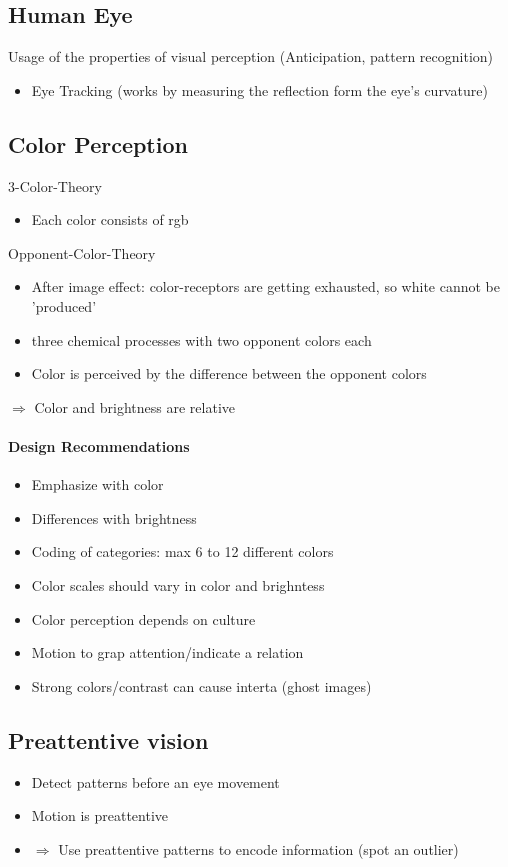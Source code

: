 \documentclass[ngerman]{scrartcl}
\begin{document}
\subsection*{Human Eye}
Usage of the properties of visual perception (Anticipation, pattern recognition)
\begin{itemize}
  \item Eye Tracking (works by measuring the reflection form the eye's curvature)
\end{itemize}

\subsection{Color Perception}
3-Color-Theory
\begin{itemize}
  \item Each color consists of rgb
\end{itemize}
Opponent-Color-Theory
\begin{itemize}
  \item After image effect: color-receptors are getting exhausted, so white cannot be 'produced'
  \item three chemical processes with two opponent colors each 
  \item Color is perceived by the difference between the opponent colors
\end{itemize}
$ \Rightarrow $ Color and brightness are relative

\paragraph*{Design Recommendations}
\begin{itemize}
  \item Emphasize with color
  \item Differences with brightness
  \item Coding of categories: max 6 to 12 different colors
  \item Color scales should vary in color and brighntess 
  \item Color perception depends on culture
  \item Motion to grap attention/indicate a relation
  \item Strong colors/contrast can cause interta (ghost images)
\end{itemize}


\subsection{Preattentive vision}
\begin{itemize}
  \item Detect patterns before an eye movement
  \item Motion is preattentive
  \item $ \Rightarrow $ Use preattentive patterns to encode information (spot an outlier)
\end{itemize}
\end{document}
